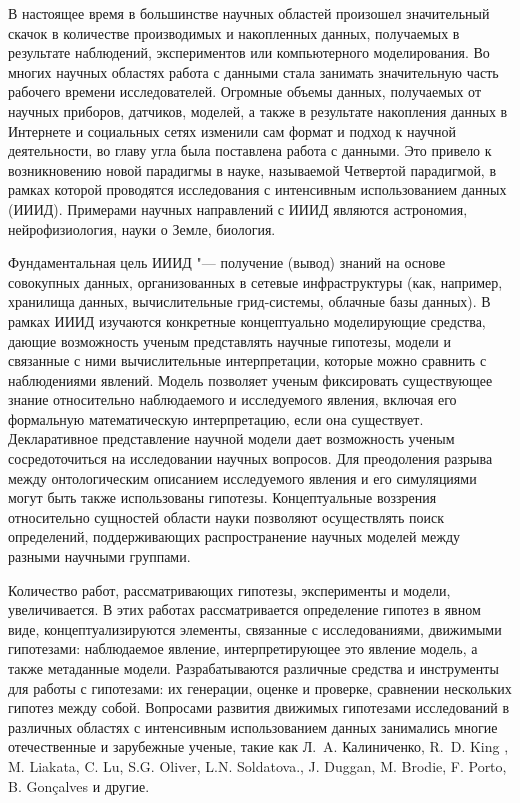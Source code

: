 
{\actuality} В настоящее время в большинстве научных областей произошел значительный скачок в количестве производимых 
и накопленных данных, получаемых в результате наблюдений, экспериментов или компьютерного моделирования. Во многих 
научных областях работа с данными стала занимать значительную часть рабочего времени исследователей. Огромные объемы 
данных, получаемых от научных приборов, датчиков, моделей, а также в результате накопления данных в Интернете и 
социальных сетях изменили сам формат и подход к научной деятельности, во главу угла была поставлена работа с данными. 
Это привело к возникновению новой парадигмы в науке, называемой Четвертой парадигмой, в рамках которой проводятся 
исследования с интенсивным использованием данных (ИИИД). Примерами научных направлений с ИИИД являются астрономия, 
нейрофизиология, науки о Земле, биология. 

Фундаментальная цель ИИИД "--- получение (вывод) знаний на основе совокупных данных, организованных в сетевые 
инфраструктуры (как, например, хранилища данных, вычислительные грид-системы, облачные базы данных). В рамках 
ИИИД изучаются конкретные концептуально моделирующие средства, дающие возможность ученым представлять научные 
гипотезы, модели и связанные с ними вычислительные интерпретации, которые можно сравнить с наблюдениями явлений. 
Модель позволяет ученым фиксировать существующее знание относительно наблюдаемого и исследуемого явления, включая 
его формальную математическую интерпретацию, если она существует. Декларативное представление научной модели дает 
возможность ученым сосредоточиться на исследовании научных вопросов. Для преодоления разрыва между онтологическим 
описанием исследуемого явления и его симуляциями могут быть также использованы гипотезы. Концептуальные воззрения 
относительно сущностей области науки позволяют осуществлять поиск определений, поддерживающих распространение 
научных моделей между разными научными группами. 

Количество работ, рассматривающих гипотезы, эксперименты и модели, увеличивается. В этих работах 
рассматривается определение гипотез в явном виде, концептуализируются элементы, связанные с исследованиями, 
движимыми гипотезами: наблюдаемое явление, интерпретирующее это явление модель, а также метаданные модели. 
Разрабатываются различные средства и инструменты для работы с гипотезами: их генерации, оценке и проверке, 
сравнении нескольких гипотез между собой. Вопросами развития движимых гипотезами исследований в различных 
областях с интенсивным использованием данных занимались многие отечественные и зарубежные ученые, такие 
как Л.~A. Калиниченко, R.~D. King , M. Liakata, C. Lu, S.G. Oliver, L.N. Soldatova., J. Duggan, M. Brodie, 
F. Porto, B. Gonçalves и другие. 

